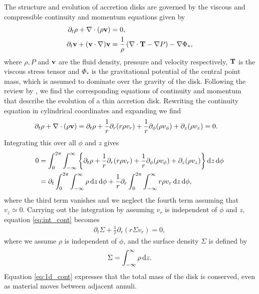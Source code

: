 The structure and evolution of accretion disks are governed by the viscous and compressible continuity and momentum equations given by \citep[eg.][]{landau1987}
\begin{align}
    \partial_t \rho + \nabla \cdot (\rho \mathbf{v}) &= 0, \label{eq:fluid_cont} \\
    \partial_t \mathbf{v} + (\mathbf{v} \cdot \nabla) \mathbf{v} &= \frac{1}{\rho} \left( \nabla \cdot \mathbf{T} - \nabla P  \right) - \nabla \Phi_*, \label{eq:fluid_mom}
\end{align}
where $\rho, P$ and $\mathbf{v}$ are the fluid density, pressure and velocity respectively, $\mathbf{T}$ is the viscous stress tensor and $\Phi_*$ is the gravitational potential of the central point mass, which is assumed to dominate over the gravity of the disk. 
Following the review by \citet{papaloizou1995}, we find the corresponding equations of continuity and momentum that describe the evolution of a thin accretion disk.
Rewriting the continuity equation in cylindrical coordinates and expanding we find
\begin{align}
    \partial_t \rho + \nabla \cdot (\rho \mathbf{v}) &= \partial_t \rho + \frac{1}{r} \partial_r (r \rho v_r) + \frac{1}{r} \partial_\phi (\rho v_\phi) + \partial_z (\rho v_z) = 0.
\end{align}
Integrating this over all $\phi$ and $z$ gives
\begin{align}
    0 &= \int_0^{2\pi} \int_{-\infty}^\infty \left\{ \partial_t \rho + \frac{1}{r} \partial_r (r \rho v_r) + \frac{1}{r} \partial_\phi (\rho v_\phi) + \partial_z (\rho v_z) \right\} \mathop{}\!\mathrm{d}{z} \mathop{}\!\mathrm{d}{\phi} \\
    &= \partial_t \int_0^{2\pi} \int_{-\infty}^\infty \rho \mathop{}\!\mathrm{d}{z} \mathop{}\!\mathrm{d}{\phi} + \frac{1}{r} \partial_r \int_0^{2\pi} \int_{-\infty}^\infty r \rho v_r \mathop{}\!\mathrm{d}{z} \mathop{}\!\mathrm{d}{\phi}, \label{eq:int_cont}
\end{align}
where the third term vanishes and we neglect the fourth term assuming that $v_z \simeq 0$.
Carrying out the integration by assuming $v_r$ is independent of $\phi$ and $z$, equation \ref{eq:int_cont} becomes
\begin{align}
    \partial_t \Sigma + \frac{1}{r} \partial_r (r \Sigma v_r) = 0, \label{eq:1d_cont}
\end{align}
where we assume $\rho$ is independent of $\phi$, and the surface density $\Sigma$ is defined by 
\begin{align}
    \Sigma = \int_{-\infty}^\infty \rho \mathop{}\!\mathrm{d}{z}.
\end{align} 
Equation \ref{eq:1d_cont} expresses that the total mass of the disk is conserved, even as material moves between adjacent annuli. 

